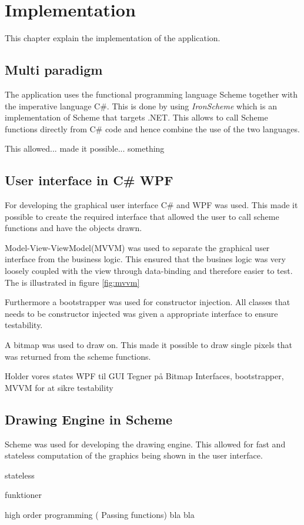 \chapter{Implementation} 
\label{chp:impl}

This chapter explain the implementation of the application.

\section{Multi paradigm}
The application uses the functional programming language Scheme together with the imperative language C\#. This is done by using \emph{IronScheme} which is an implementation of Scheme that targets .NET. This allows to call Scheme functions directly from C\# code and hence combine the use of the two languages.

This allowed... made it possible... something

\section{User interface in C\# WPF}
For developing the graphical user interface C\# and WPF was used. This made it possible to create the required interface that allowed the user to call scheme functions and have the objects drawn. 

Model-View-ViewModel(MVVM) was used to separate the graphical user interface from the business logic.  This ensured that the busines logic was very loosely coupled with the view through data-binding and therefore easier to test. The is illustrated in figure \ref{fig:mvvm}


Furthermore a bootstrapper was used for constructor injection. All classes that needs to be constructor injected was given a appropriate interface to ensure testability.

A bitmap was used to draw on. This made it possible to draw single pixels that was returned from the scheme functions.


Holder vores states
WPF til GUI
Tegner på Bitmap
Interfaces, bootstrapper, MVVM for at sikre testability

\section{Drawing Engine in Scheme}
Scheme was used for developing the drawing engine. This allowed for fast and stateless computation of the graphics being shown in the user interface. 

stateless

funktioner

high order programming ( Passing functions) bla bla